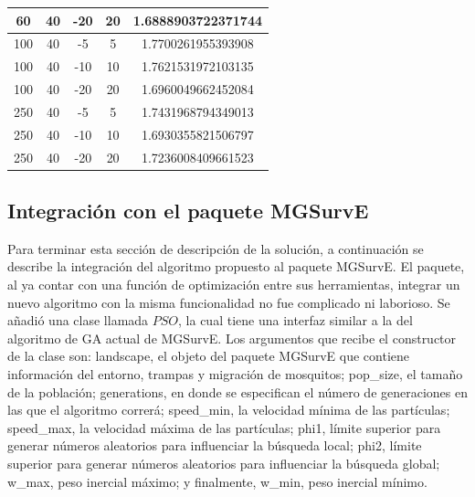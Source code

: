 \documentclass[letterpaper]{report}
\begin{document}
\begin{table}[ht!]
\begin{center}
\begin{tabular}{|c|c|c|c|c|}
          \hline
          \rowcolor[HTML]{CCEEBB}
          60 & 40 & -20 & 20 & \cellcolor[HTML]{00AB67} 1.6888903722371744 \\
          \hline
          100 & 40 & -5 & 5 & 1.7700261955393908 \\
          \hline
          100 & 40 & -10 & 10 & 1.7621531972103135 \\
          \hline
          \rowcolor[HTML]{CCEEBB}
          100 & 40 & -20 & 20 & 1.6960049662452084 \\
          \hline
          250 & 40 & -5 & 5 & 1.7431968794349013 \\
          \hline
          \rowcolor[HTML]{CCEEBB}
          250 & 40 & -10 & 10 & 1.6930355821506797 \\
          \hline
          250 & 40 & -20 & 20 & 1.7236008409661523 \\
          \hline
        \end{tabular}
        \label{table:params-results}
      \end{center}
    \end{table}

    \subsection{Integración con el paquete MGSurvE}

    Para terminar esta sección de descripción de la solución, a continuación se
    describe la integración del algoritmo propuesto al paquete MGSurvE. El
    paquete, al ya contar con una función de optimización entre sus
    herramientas, integrar un nuevo algoritmo con la misma funcionalidad no fue
    complicado ni laborioso. Se añadió una clase llamada $PSO$, la cual tiene
    una interfaz similar a la del algoritmo de GA actual de MGSurvE. Los
    argumentos que recibe el constructor de la clase son: landscape, el objeto
    del paquete MGSurvE que contiene información del entorno, trampas y
    migración de mosquitos; pop\_size, el tamaño de la población; generations,
    en donde se especifican el número de generaciones en las que el algoritmo
    correrá; speed\_min, la velocidad mínima de las partículas; speed\_max, la
    velocidad máxima de las partículas; phi1, límite superior para generar
    números aleatorios para influenciar la búsqueda local; phi2, límite superior
    para generar números aleatorios para influenciar la búsqueda global; w\_max,
    peso inercial máximo; y finalmente, w\_min, peso inercial mínimo.
    
\end{document}
